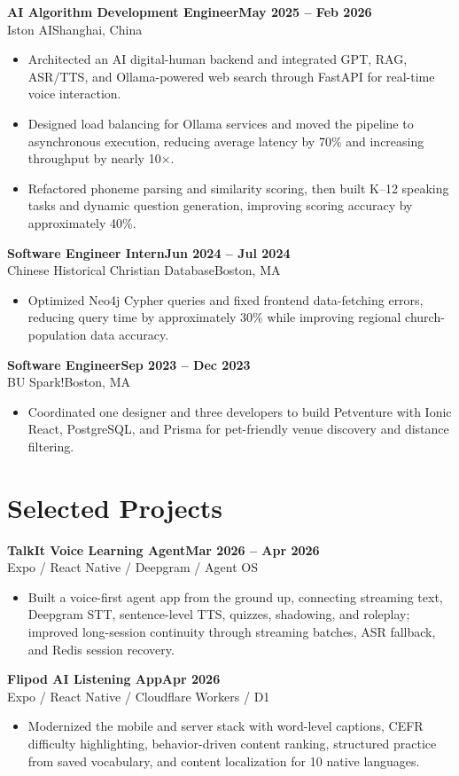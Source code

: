 \documentclass[10pt,letterpaper]{article}
\newcommand{\role}[4]{%
  \textbf{#1}\hfill\textbf{#2}\\[-1pt]
  \textcolor{muted}{#3}\hfill\textcolor{muted}{#4}\par
}
\begin{document}
\role{AI Algorithm Development Engineer}{May 2025 -- Feb 2026}{Iston AI}{Shanghai, China}
\begin{itemize}
  \item Architected an AI digital-human backend and integrated GPT, RAG, ASR/TTS, and Ollama-powered web search through FastAPI for real-time voice interaction.
  \item Designed load balancing for Ollama services and moved the pipeline to asynchronous execution, reducing average latency by 70\% and increasing throughput by nearly 10$\times$.
  \item Refactored phoneme parsing and similarity scoring, then built K--12 speaking tasks and dynamic question generation, improving scoring accuracy by approximately 40\%.
\end{itemize}

\role{Software Engineer Intern}{Jun 2024 -- Jul 2024}{Chinese Historical Christian Database}{Boston, MA}
\begin{itemize}
  \item Optimized Neo4j Cypher queries and fixed frontend data-fetching errors, reducing query time by approximately 30\% while improving regional church-population data accuracy.
\end{itemize}

\role{Software Engineer}{Sep 2023 -- Dec 2023}{BU Spark!}{Boston, MA}
\begin{itemize}
  \item Coordinated one designer and three developers to build Petventure with Ionic React, PostgreSQL, and Prisma for pet-friendly venue discovery and distance filtering.
\end{itemize}

\section{Selected Projects}

\role{TalkIt Voice Learning Agent}{Mar 2026 -- Apr 2026}{Expo / React Native / Deepgram / Agent OS}{}
\begin{itemize}
  \item Built a voice-first agent app from the ground up, connecting streaming text, Deepgram STT, sentence-level TTS, quizzes, shadowing, and roleplay; improved long-session continuity through streaming batches, ASR fallback, and Redis session recovery.
\end{itemize}

\role{Flipod AI Listening App}{Apr 2026}{Expo / React Native / Cloudflare Workers / D1}{}
\begin{itemize}
  \item Modernized the mobile and server stack with word-level captions, CEFR difficulty highlighting, behavior-driven content ranking, structured practice from saved vocabulary, and content localization for 10 native languages.
\end{itemize}
\end{document}
